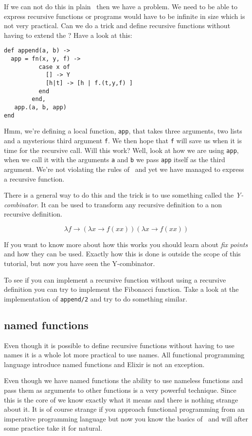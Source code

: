\documentclass[a4paper,11pt]{article}
\begin{document}
If we can not do this in plain \lamc\ then we have a problem. We need
to be able to express recursive functions or programs would have to be
infinite in size which is not very practical. Can we do a trick and
define recursive functions without having to extend the \lamc? Have a
look at this:

\begin{verbatim}
def append(a, b) ->
  app = fn(x, y, f) -> 
          case x of 
            [] -> Y
            [h|t] -> [h | f.(t,y,f) ]
          end
        end,
   app.(a, b, app)
end
\end{verbatim}

Hmm, we're defining a local function, {\tt app}, that takes three
arguments, two lists and a mysterious third argument {\tt f}. We then
hope that {\tt f} will save us when it is time for the recursive
call. Will this work? Well, look at how we are using {\tt app}, when
we call it with the arguments {\tt a} and {\tt b} we pass {\tt app}
itself as the third argument. We're not violating the rules of \lamc\
and yet we have managed to express a recursive function.

There is a general way to do this and the trick is to use something
called the {\em Y-combinator}. It can be used to transform any
recursive definition to a non recursive definition.

$$\lambda f \rightarrow (\lambda x \rightarrow f(x x)) (\lambda x \rightarrow f (x x))$$

If you want to know more about how this works you should learn about
{\em fix points} and how they can be used. Exactly how this is done is outside
the scope of this tutorial, but now you have seen the Y-combinator.

To see if you can implement a recursive function without using a
recursive definition you can try to implement the Fibonacci
function. Take a look at the implementation of {\tt append/2} and try
to do something similar.

\subsection{named functions}

Even though it is possible to define recursive functions without
having to use names it is a whole lot more practical to use names.
All functional programming language introduce named functions and
Elixir is not an exception.

Even though we have named functions the ability to use nameless
functions and pass them as arguments to other functions is a very
powerful technique. Since this is the core of \lamc we know exactly
what it means and there is nothing strange about it. It is of course
strange if you approach functional programming from an imperative
programming language but now you know the basics of \lamc\ and will
after some practice take it for natural.
\end{document}
